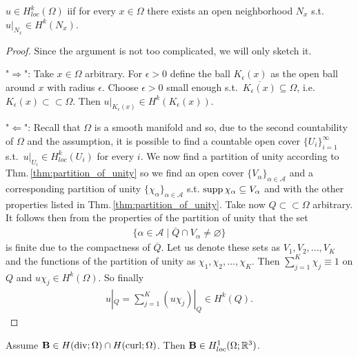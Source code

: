 \documentclass[../master_thesis.tex]{subfiles}
\begin{document}
\begin{lemma}\label{lem:Hkloc_iif_Sobolev_in_neighborhood}
    $u \in H^k_{loc}(\Omega)$ iif for every $x \in \Omega$ there exists 
    an open neighborhood $N_x$ s.t.~$u|_{N_x} \in H^k(N_x)$.
\end{lemma}
\begin{proof}
    Since the argument is not too complicated, we will only sketch it.


    \noindent"$\Rightarrow$": Take $x \in \Omega$ arbitrary. For $\epsilon > 0$ define 
    the ball $K_\epsilon(x)$ as the open ball around $x$ with radius $\epsilon$.
    Choose $\epsilon >0 $
    small enough s.t.~$\overline{ K_\epsilon(x)} \subseteq \Omega$, i.e.
    $K_\epsilon(x) \subset\subset \Omega$. Then $u|_{K_\epsilon(x)} \in H^k(K_\epsilon(x))$.

    \noindent"$\Leftarrow$": 
    Recall that $\Omega$ is a smooth manifold and so,
    due to the second countability of $\Omega$ and the assumption, it is possible to find a countable open cover 
    $\{ U_i \}_{i=1}^{\infty}$ s.t.~$u|_{U_i}\in H^k_{loc}(U_i)$ for every $i$.
    We now find a partition of unity according to Thm.\,\ref{thm:partition_of_unity}
    so we find an open cover $\{ V_\alpha \}_{\alpha\in \mathcal{A}}$ and a corresponding
    partition of unity $\{ \chi_\alpha \}_{\alpha \in \mathcal{A}}$
    s.t. $\operatorname{supp} \chi_\alpha \subseteq V_\alpha$ and with the other properties listed in 
    Thm.\,\ref{thm:partition_of_unity}. 
    Take now $Q \subset\subset \Omega$ arbitrary.
    It follows then from the properties of 
    the partition of unity that the set 
    \begin{align*}
        \{ \alpha \in \mathcal{A} \mid \overline{Q} \cap V_\alpha \neq \varnothing \}
    \end{align*}
    is finite due to the compactness of $\overline{Q}$. 
    Let us denote these sets as $V_1, V_2, ..., V_K$ and the functions of the partition of 
    unity as $\chi_1, \chi_2, ..., \chi_K$. Then $\sum_{j=1}^K \chi_j \equiv 1$ on $Q$ 
    and $u\chi_j \in H^k(\Omega)$. So finally 
    \begin{align*}
        u|_Q = \sum_{j=1}^K (u \chi_j)|_Q \in H^k(Q).
    \end{align*}
\end{proof}
\begin{theorem}\label{thm:solution_in_H1loc}
    Assume $\mathbf{B} \in H(\operatorname{div};\Omega) \cap H(\operatorname{curl};\Omega)$. Then 
    $\mathbf{B} \in H^1_{loc}(\Omega;\mathbb{R}^3)$.
\end{theorem}
\end{document}
